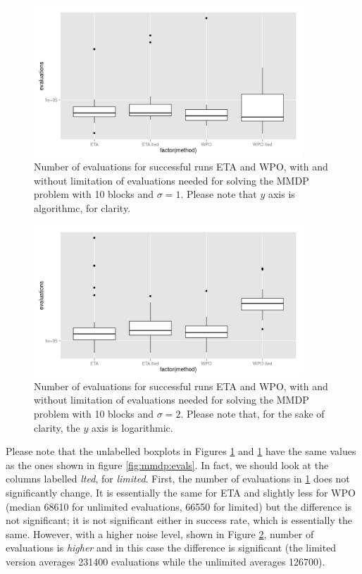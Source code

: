 \documentclass{svmult}
\begin{document}
\begin{figure}[!ht] 
\centering
\includegraphics[width=0.9\textwidth]{../images/ns1-MMDP.png}
\caption{Number of evaluations for successful runs ETA and WPO, with
  and without limitation of evaluations needed for solving the MMDP
  problem with 10 blocks and $\sigma=1$. Please note that $y$ axis is
  algorithmc, for clarity. \label{fig:lted:ns1}}
\end{figure}
%
\begin{figure}[!ht] 
\centering
\includegraphics[width=0.9\textwidth]{../images/ns2-MMDP.png}
\caption{Number of evaluations for successful runs ETA and WPO, with
  and without limitation of evaluations needed for solving the MMDP
  problem with 10 blocks and $\sigma=2$. Please note that, for the
  sake of clarity, the $y$ axis is logarithmic.\label{fig:lted:ns2}}
\end{figure}
%
Please note that the unlabelled boxplots in Figures
\ref{fig:lted:ns1} and  \ref{fig:lted:ns1}
have the same values as the ones shown in figure
\ref{fig:mmdp:evals}. In fact, we should look at the columns labelled
{\em lted}, for {\em limited}. First, the number of evaluations in
\ref{fig:lted:ns1} does not significantly change.
 It is essentially
the same for ETA and slightly less for WPO (median 68610 for unlimited
evaluations, 66550 for limited) but the difference is not significant;
it is not significant either in success rate, which is essentially the
same. However, with a higher noise level, shown in Figure
\ref{fig:lted:ns2}, number of evaluations is {\em higher} and in this
case the difference is significant (the limited version averages
231400 evaluations while the unlimited averages 126700). 
\end{document}
